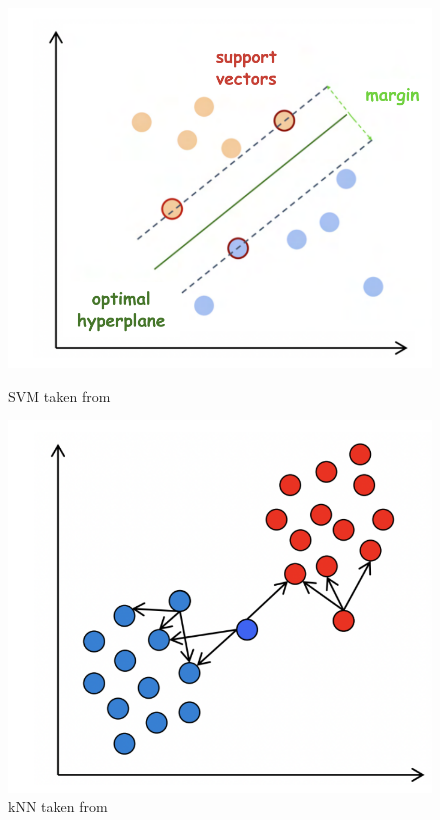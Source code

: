     \begin{figure}[!htbp]
        \centering
        \begin{minipage}[b]{0.45\columnwidth}
            \includegraphics[width=\textwidth]{images/svm.pdf}
            \caption{SVM taken from \parencite{ml}}
            \label{fig:ur10}
        \end{minipage}
        \hfill
        \begin{minipage}[b]{0.45\columnwidth}
            \includegraphics[width=\textwidth]{images/knn.png}
            \caption{kNN taken from \parencite{ml}} 
            \label{fig:reduced}
        \end{minipage}
        \vspace{0.5cm} %
    \end{figure}
    




